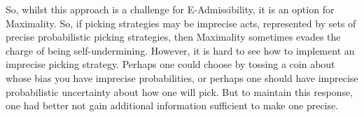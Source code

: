 \documentclass[a4paper,final]{article}
\newcommand{\todoold}[2][]{\todo[backgroundcolor=white,bordercolor=orange!10,linecolor=gray!10, #1,caption={},textcolor=gray]{Pre-rev: #2}}
\newcommand{\todooldinfo}[2][]{\todoold[#1]{#2}}
\newenvironment{CCM rewritten}
{\begingroup\color{blue}} %
{\endgroup}              %
\begin{document}
	So, whilst this approach is a challenge for E-Admissibility, it is an option for Maximality.  
	So, if picking strategies may be imprecise acts, represented by sets of precise probabilistic picking strategies, then Maximality sometimes evades the charge of being self-undermining. However, it is hard to see how to implement an imprecise picking strategy. Perhaps one could choose by tossing a coin about whose bias you have imprecise probabilities, or perhaps one should have imprecise probabilistic uncertainty about how one will pick. But to maintain this response, one had better not gain additional information sufficient to make one precise. 
	

	
	
	
\end{document}
